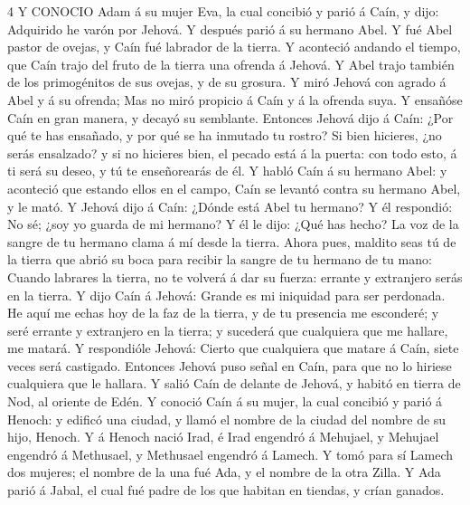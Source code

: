 \lettrine{4}{}
Y CONOCIO Adam á su mujer Eva, la cual concibió y parió á Caín, y dijo: Adquirido he varón por Jehová. 
Y después parió á su hermano Abel. Y fué Abel pastor de ovejas, y Caín fué labrador de la tierra. 
Y aconteció andando el tiempo, que Caín trajo del fruto de la tierra una ofrenda á Jehová. 
Y Abel trajo también de los primogénitos de sus ovejas, y de su grosura. Y miró Jehová con agrado á Abel y á su ofrenda; 
Mas no miró propicio á Caín y á la ofrenda suya. Y ensañóse Caín en gran manera, y decayó su semblante. 
Entonces Jehová dijo á Caín: ¿Por qué te has ensañado, y por qué se ha inmutado tu rostro? 
Si bien hicieres, ¿no serás ensalzado? y si no hicieres bien, el pecado está á la puerta: con todo esto, á ti será su deseo, y tú te enseñorearás de él. 
Y habló Caín á su hermano Abel: y aconteció que estando ellos en el campo, Caín se levantó contra su hermano Abel, y le mató. 
Y Jehová dijo á Caín: ¿Dónde está Abel tu hermano? Y él respondió: No sé; ¿soy yo guarda de mi hermano? 
Y él le dijo: ¿Qué has hecho? La voz de la sangre de tu hermano clama á mí desde la tierra. 
Ahora pues, maldito seas tú de la tierra que abrió su boca para recibir la sangre de tu hermano de tu mano: 
Cuando labrares la tierra, no te volverá á dar su fuerza: errante y extranjero serás en la tierra. 
Y dijo Caín á Jehová: Grande es mi iniquidad para ser perdonada. 
He aquí me echas hoy de la faz de la tierra, y de tu presencia me esconderé; y seré errante y extranjero en la tierra; y sucederá que cualquiera que me hallare, me matará. 
Y respondióle Jehová: Cierto que cualquiera que matare á Caín, siete veces será castigado. Entonces Jehová puso señal en Caín, para que no lo hiriese cualquiera que le hallara. 
Y salió Caín de delante de Jehová, y habitó en tierra de Nod, al oriente de Edén. 
Y conoció Caín á su mujer, la cual concibió y parió á Henoch: y edificó una ciudad, y llamó el nombre de la ciudad del nombre de su hijo, Henoch. 
Y á Henoch nació Irad, é Irad engendró á Mehujael, y Mehujael engendró á Methusael, y Methusael engendró á Lamech. 
Y tomó para sí Lamech dos mujeres; el nombre de la una fué Ada, y el nombre de la otra Zilla. 
Y Ada parió á Jabal, el cual fué padre de los que habitan en tiendas, y crían ganados. 
